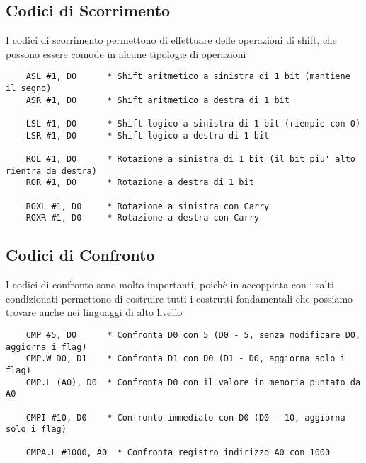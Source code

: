 \subsection{Codici di Scorrimento}
I codici di scorrimento permettono di effettuare delle operazioni di shift, che possono essere comode in alcune tipologie di operazioni
\begin{lstlisting}
    ASL #1, D0      * Shift aritmetico a sinistra di 1 bit (mantiene il segno)
    ASR #1, D0      * Shift aritmetico a destra di 1 bit

    LSL #1, D0      * Shift logico a sinistra di 1 bit (riempie con 0)
    LSR #1, D0      * Shift logico a destra di 1 bit

    ROL #1, D0      * Rotazione a sinistra di 1 bit (il bit piu' alto rientra da destra)
    ROR #1, D0      * Rotazione a destra di 1 bit

    ROXL #1, D0     * Rotazione a sinistra con Carry
    ROXR #1, D0     * Rotazione a destra con Carry
\end{lstlisting}

\subsection{Codici di Confronto} \label{par:confronto}
I codici di confronto sono molto importanti, poichè in accoppiata con i salti condizionati permettono di costruire tutti i costrutti fondamentali che possiamo trovare anche nei linguaggi di alto livello
\begin{lstlisting}
    CMP #5, D0      * Confronta D0 con 5 (D0 - 5, senza modificare D0, aggiorna i flag)
    CMP.W D0, D1    * Confronta D1 con D0 (D1 - D0, aggiorna solo i flag)
    CMP.L (A0), D0  * Confronta D0 con il valore in memoria puntato da A0

    CMPI #10, D0    * Confronto immediato con D0 (D0 - 10, aggiorna solo i flag)

    CMPA.L #1000, A0  * Confronta registro indirizzo A0 con 1000
\end{lstlisting}

